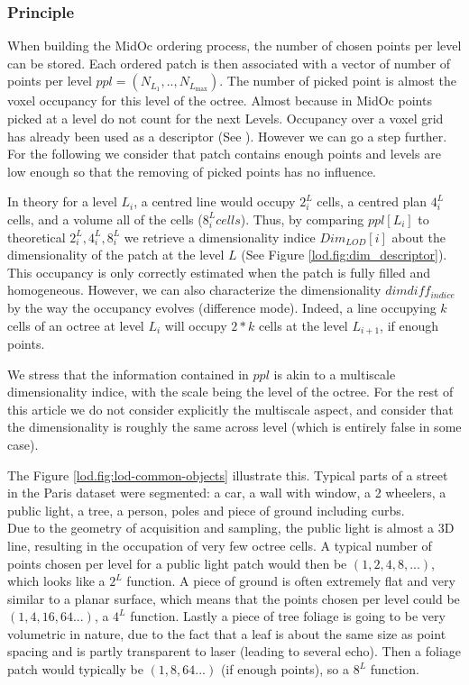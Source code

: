 		\subsubsection{Principle}
		When building the MidOc ordering process, the number of chosen points per level can be stored.
		Each ordered patch is then associated with a vector of number of points per level $ppl=(N_{L_{1}},..,N_{L_{\text{max}}})$.
		The number of picked point is almost the voxel occupancy for this level of the octree.
		Almost because in MidOc points picked at a level do not count for the next Levels.
		Occupancy over a voxel grid has already been used as a descriptor (See \cite{Bustos2005}).
		However we can go a step further.
		For the following we consider that patch contains enough points and levels are low enough so that the removing of picked points has no influence.
		
		In theory for a level $L_i$, a centred line would occupy $2^L_i$ cells, a centred plan $4^L_i$ cells, and a volume all of the cells ($8^L_i cells$).
		Thus, by comparing $ppl[L_i]$ to theoretical $2^L_i, 4^L_i, 8^L_i$ we retrieve a dimensionality indice  $Dim_{LOD}[i]$  about the dimensionality of the patch at the level $L$ (See Figure \ref{lod.fig:dim_descriptor}). 
		This occupancy is only correctly estimated when the patch is fully filled and homogeneous. 
		However, we can also characterize the dimensionality $dimdiff_{indice}$ by the way the occupancy evolves (difference mode).
		Indeed, a line occupying $k$ cells of an octree at level $L_i$ will occupy $2*k$ cells at the level $L_{i+1}$, if enough points.
		
		We stress that the information contained in $ppl$ is akin to a multiscale dimensionality indice,
		with the scale being the level of the octree.
		For the rest of this article we do not consider explicitly the multiscale aspect,
		 and consider that the dimensionality is roughly the same across level 
		 (which is entirely false in some case).
		
		The Figure \ref{lod.fig:lod-common-objects} illustrate this. Typical parts of a street in the Paris dataset were segmented: a car, a wall with window, a 2 wheelers, a public light, a tree, a person, poles and piece of ground including curbs.
		\\
		Due to the geometry of acquisition and sampling, the public light is almost a 3D line, resulting in the occupation of very few octree cells.
		A typical number of points chosen per level for a public light patch would then be $(1,2,4,8,...)$, which looks like a $2^L$ function.
		A piece of ground is often extremely flat and very similar to a planar surface,
		which means that the points chosen per level could be $(1,4,16,64...)$, a $4^L$ function.
		Lastly a piece of tree foliage is going to be very volumetric in nature,
		due to the fact that a leaf is about the same size as point spacing and is partly transparent to laser (leading to several echo).
		Then a foliage patch would typically be $(1,8,64...)$ (if enough points), so a $8^L$ function.
		 
